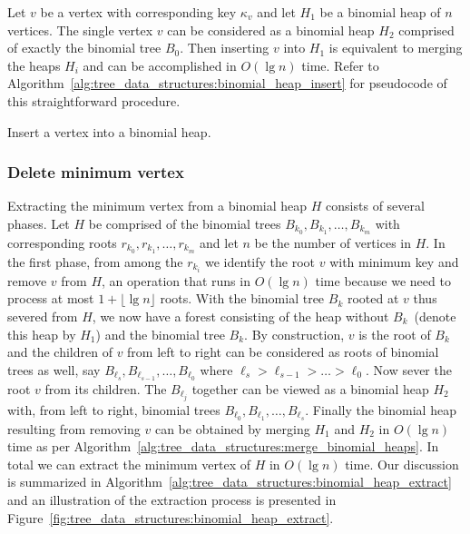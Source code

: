 Let $v$ be a vertex with corresponding key $\kappa_v$ and let $H_1$ be
a binomial heap of $n$ vertices. The single vertex $v$ can be
considered as a binomial heap $H_2$ comprised of exactly the binomial
tree $B_0$. Then inserting $v$ into $H_1$ is equivalent to merging the
heaps $H_i$ and can be accomplished in $O(\lg n)$ time. Refer to
Algorithm~\ref{alg:tree_data_structures:binomial_heap_insert} for
pseudocode of this straightforward procedure.

\begin{algorithm}[!htbp]

\caption{Insert a vertex into a binomial heap.}
\label{alg:tree_data_structures:binomial_heap_insert}
\end{algorithm}



\subsubsection{Delete minimum vertex}

Extracting the minimum vertex from a binomial heap $H$ consists of
several phases. Let $H$ be comprised of the binomial trees
$B_{k_0}, B_{k_1}, \dots, B_{k_m}$ with corresponding roots
$r_{k_0}, r_{k_1}, \dots, r_{k_m}$ and let $n$ be the number of
vertices in $H$. In the first phase, from among the $r_{k_i}$ we
identify the root $v$ with minimum key and remove $v$ from $H$, an
operation that runs in $O(\lg n)$ time because we need to process at
most $1 + \lfloor \lg n \rfloor$ roots. With the binomial tree $B_k$
rooted at $v$ thus severed from $H$, we now have a forest consisting
of the heap without $B_k$~(denote this heap by $H_1$) and the binomial
tree $B_k$. By construction, $v$ is the root of $B_k$ and the children
of $v$ from left to right can be considered as roots of binomial trees
as well, say $B_{\ell_s}, B_{\ell_{s-1}}, \dots, B_{\ell_0}$ where
$\ell_s > \ell_{s-1} > \dots > \ell_0$. Now sever the root $v$ from
its children. The $B_{\ell_j}$ together can be viewed as a binomial
heap $H_2$ with, from left to right, binomial trees
$B_{\ell_0}, B_{\ell_1}, \dots, B_{\ell_s}$. Finally the binomial heap
resulting from removing $v$ can be obtained by merging $H_1$ and $H_2$
in $O(\lg n)$ time as per
Algorithm~\ref{alg:tree_data_structures:merge_binomial_heaps}. In
total we can extract the minimum vertex of $H$ in $O(\lg n)$ time. Our
discussion is summarized in
Algorithm~\ref{alg:tree_data_structures:binomial_heap_extract} and an
illustration of the extraction process is presented in
Figure~\ref{fig:tree_data_structures:binomial_heap_extract}.

